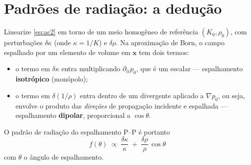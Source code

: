 \documentclass[11pt,a4paper,oneside]{report}
\begin{document}
\section{Padr\~oes de radia\c{c}\~ao: a dedu\c{c}\~ao}
\label{sec:radiacao}

\begin{derivacao}
Linearize \eqref{eq:ac2} em torno de um meio homog\^eneo de refer\^encia
$(K_0,\rho_0)$, com perturba\c{c}\~oes $\delta\kappa$ (onde
$\kappa = 1/K$) e $\delta\rho$. Na aproxima\c{c}\~ao de Born, o campo
espalhado por um elemento de volume em $\mathbf{x}$ tem dois termos:
\begin{itemize}[leftmargin=*, itemsep=1pt]
\item o termo em $\delta\kappa$ entra multiplicando $\partial_{tt}p_0$, que
\'e um escalar --- espalhamento \textbf{isotr\'opico} (mon\'opolo);
\item o termo em $\delta(1/\rho)$ entra dentro de um divergente aplicado a
$\nabla p_0$, ou seja, envolve o produto das \emph{dire\c{c}\~oes} de
propaga\c{c}\~ao incidente e espalhada --- espalhamento \textbf{dipolar},
proporcional a $\cos\theta$.
\end{itemize}
O padr\~ao de radia\c{c}\~ao do espalhamento P--P \'e portanto
\begin{equation}
\boxed{\;
f(\theta) \;\propto\; \frac{\delta\kappa}{\kappa}
 \;+\; \frac{\delta\rho}{\rho}\,\cos\theta \;}
\label{eq:radiacao}
\end{equation}
com $\theta$ o \^angulo de espalhamento.
\end{derivacao}
\end{document}

